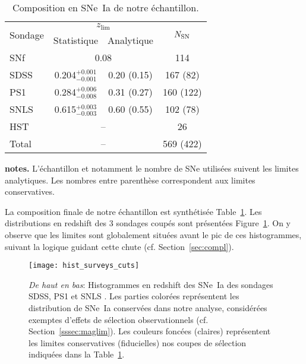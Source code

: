 \documentclass[../main/main.tex]{subfiles}
\begin{document}
\begin{table}[]
    \centering
    \begin{threeparttable}
        \caption{Composition en SNe~Ia de notre échantillon.}
        \label{tab:zlimsample}
        \begin{tabular}{lccc}
            \toprule
            \multirow{2}[3]{*}{Sondage} &
            \multicolumn{2}{c}{$z_{\lim}$} &
            \multirow{2}[3]{*}{$N_{\rm SN}$}\\
            \cmidrule(lr){2-3}
            & Statistique & Analytique & \\
            \midrule
            SNf &
            \multicolumn{2}{c}{0.08} &
            114 \\
            SDSS & 
            0.204$^{+0.001}_{-0.001}$ & 0.20 (0.15) &
            167 (82) \\
            PS1 &
            0.284$^{+0.006}_{-0.008}$ & 0.31 (0.27) &
            160 (122) \\
            SNLS &
            0.615$^{+0.003}_{-0.003}$ & 0.60 (0.55) &
            102 (78) \\
            HST &
            \multicolumn{2}{c}{--} &
            26 \\
            \midrule
            Total & \multicolumn{2}{c}{--} &
            569 (422)\\
            \bottomrule
        \end{tabular}
        \begin{tablenotes}[flushleft]
        \item \textbf{notes.} L'échantillon et notamment le nombre de SNe
            utilisées suivent les limites analytiques. Les nombres entre
            parenthèse correspondent aux limites conservatives.
        \end{tablenotes}
    \end{threeparttable}
\end{table}

La composition finale de notre échantillon est synthétisée
Table~\ref{tab:zlimsample}. Les distributions en redshift des 3 sondages coupés
sont présentées Figure~\ref{fig:cuts}. On y observe que les limites sont
globalement situées avant le pic de ces histogrammes, suivant la logique guidant
cette chute (cf. Section~\ref{sec:compl}).

\begin{figure}
    \centering
    \texttt{[image: hist\_surveys\_cuts]}
    \caption{\textit{De haut en bas}: Histogrammes en redshift des SNe~Ia des
        sondages SDSS, PS1 et SNLS \citep[données de Pantheon,][]{scolnic2018}.
        Les parties colorées représentent les distribution de SNe~Ia conservées
        dans notre analyse, considérées exemptes d'effets de sélection
        observationnels (cf. Section~\ref{sssec:maglim}). Les couleurs foncées
        (claires) représentent les limites conservatives (fiducielles) nos
    coupes de sélection indiquées dans la Table~\ref{tab:zlimsample}.}
    \label{fig:cuts}
\end{figure}
\end{document}
